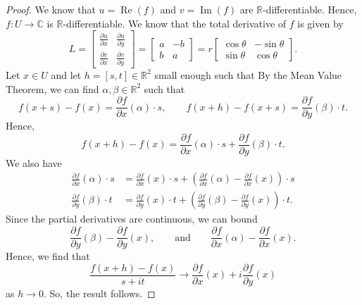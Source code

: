 \documentclass[a4paper, openany]{memoir}
\theoremstyle{definition}
\theoremstyle{plain}
\begin{document}
    \begin{proof}
        We know that $u = \operatorname{Re}(f)$ and $v = \operatorname{Im}(f)$ are $\mathbb{R}$-differentiable. Hence, $f \colon U \to \mathbb{C}$ is $\mathbb{R}$-differentiable. We know that the total derivative of $f$ is given by
        \[L = \begin{bmatrix}
            \frac{\partial u}{\partial x} & \frac{\partial u}{\partial y} \\
            \frac{\partial v}{\partial x} & \frac{\partial v}{\partial y} 
        \end{bmatrix} = \begin{bmatrix}
            a & -b \\
            b & a
        \end{bmatrix} = r \begin{bmatrix}
            \cos \theta & -\sin \theta \\
            \sin \theta & \cos \theta
        \end{bmatrix}.\]
        Let $x \in U$ and let $h = [s, t] \in \mathbb{R}^2$ small enough such that 
        By the Mean Value Theorem, we can find $\alpha, \beta \in \mathbb{R}^2$ such that
        \[f(x + s) - f(x) = \frac{\partial f}{\partial x}(\alpha) \cdot s, \qquad f(x + h) - f(x + s) = \frac{\partial f}{\partial y}(\beta) \cdot t.\]
        Hence,
        \[f(x + h) - f(x) = \frac{\partial f}{\partial x}(\alpha) \cdot s + \frac{\partial f}{\partial y}(\beta) \cdot t.\]
        We also have
        \begin{align*}
            \frac{\partial f}{\partial x}(\alpha) \cdot s &= \frac{\partial f}{\partial x}(x) \cdot s + \left(\frac{\partial f}{\partial x}(\alpha) - \frac{\partial f}{\partial x} (x)\right) \cdot s \\
            \frac{\partial f}{\partial y}(\beta) \cdot t &= \frac{\partial f}{\partial y}(x) \cdot t + \left(\frac{\partial f}{\partial y}(\beta) - \frac{\partial f}{\partial y}(x)\right) \cdot t.
        \end{align*}
        Since the partial derivatives are continuous, we can bound 
        \[\frac{\partial f}{\partial y}(\beta) - \frac{\partial f}{\partial y}(x), \qquad \textrm{and} \qquad \frac{\partial f}{\partial x}(\alpha) - \frac{\partial f}{\partial x}(x).\]
        Hence, we find that 
        \[\frac{f(x + h) - f(x)}{s + it} \to \frac{\partial f}{\partial x}(x) + i \frac{\partial f}{\partial y}(x)\]
        as $h \to 0$. So, the result follows.
    \end{proof}
\end{document}
